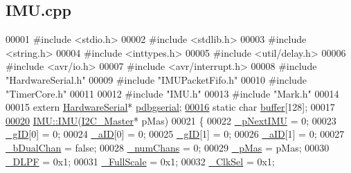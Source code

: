 \hypertarget{_i_m_u_8cpp_source}{
\subsection{IMU.cpp}
}

\begin{DoxyCode}
00001 \textcolor{preprocessor}{#include <stdio.h>}
00002 \textcolor{preprocessor}{#include <stdlib.h>}
00003 \textcolor{preprocessor}{#include <string.h>}
00004 \textcolor{preprocessor}{#include <inttypes.h>}
00005 \textcolor{preprocessor}{#include <util/delay.h>}
00006 \textcolor{preprocessor}{#include <avr/io.h>}
00007 \textcolor{preprocessor}{#include <avr/interrupt.h>}
00008 \textcolor{preprocessor}{#include "HardwareSerial.h"}
00009 \textcolor{preprocessor}{#include "IMUPacketFifo.h"}
00010 \textcolor{preprocessor}{#include "TimerCore.h"}
00011 
00012 \textcolor{preprocessor}{#include "IMU.h"}
00013 \textcolor{preprocessor}{#include "Mark.h"}
00014 
00015 \textcolor{keyword}{extern} \hyperlink{class_hardware_serial}{HardwareSerial}* \hyperlink{_gyro_acc_8cpp_a953e918236b1fd18b8f07bad1217ecbe}{pdbgserial};
\hypertarget{_i_m_u_8cpp_source_l00016}{}\hyperlink{_i_m_u_8cpp_a38e7c3f1ce348a3ed20459d277245263}{00016} \textcolor{keyword}{static} \textcolor{keywordtype}{char} \hyperlink{_i_m_u_8cpp_a38e7c3f1ce348a3ed20459d277245263}{buffer}[128];
00017 
\hypertarget{_i_m_u_8cpp_source_l00020}{}\hyperlink{class_i_m_u_ab77a4c6c64f65642c42ebbf55a4e7a1e}{00020} \hyperlink{class_i_m_u_ab77a4c6c64f65642c42ebbf55a4e7a1e}{IMU::IMU}(\hyperlink{class_i2_c___master}{I2C_Master}* pMas)
00021 \{
00022     \hyperlink{class_i_m_u_a72d5aa462d6627b458db76ca6567d130}{_pNextIMU}       = 0;
00023     \hyperlink{class_i_m_u_a47ffe20a032e3a890cd3891793a60a40}{_gID}[0]         = 0;
00024     \hyperlink{class_i_m_u_a10141bdc27465c95de6c8285d1542d78}{_aID}[0]         = 0;
00025     \hyperlink{class_i_m_u_a47ffe20a032e3a890cd3891793a60a40}{_gID}[1]         = 0;
00026     \hyperlink{class_i_m_u_a10141bdc27465c95de6c8285d1542d78}{_aID}[1]         = 0;
00027     \hyperlink{class_i_m_u_a62978e791838c3b4829e1d3d683e99b2}{_bDualChan}      = \textcolor{keyword}{false};
00028     \hyperlink{class_i_m_u_a27df580b4559aaf3234469bfe16eb158}{_numChans}       = 0;
00029     \hyperlink{class_i_m_u_a466148932203b7250c83a4c5bb684ca1}{_pMas}           = pMas;
00030     \hyperlink{class_i_m_u_a3f9e6159234449cde8f5e72da8acf751}{_DLPF}           = 0x1;
00031     \hyperlink{class_i_m_u_a059c02011a10bb90aecc9692ed345771}{_FullScale}      = 0x1;
00032     \hyperlink{class_i_m_u_a4dbeaf17fd1ae9b41b5c3fe61706e5f1}{_ClkSel}         = 0x1;

\end{DoxyCode}

